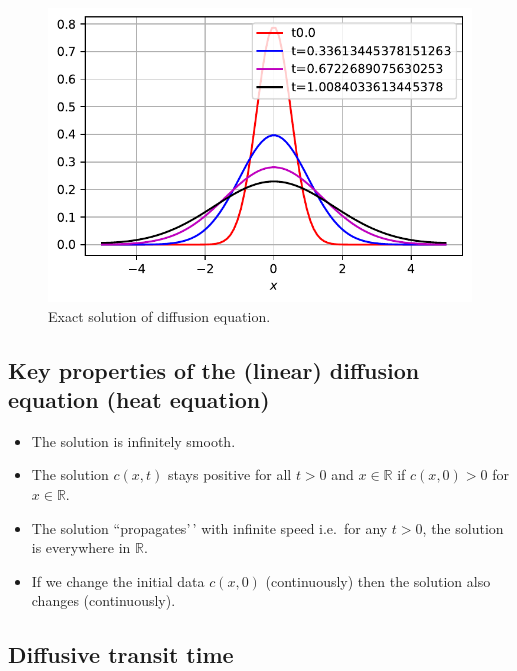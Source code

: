 \documentclass[
  letterpaper,
  DIV=11,
  numbers=noendperiod]{scrreprt}
\providecommand{\tightlist}{%
  \setlength{\itemsep}{0pt}\setlength{\parskip}{0pt}}\usepackage{longtable,booktabs,array}
\theoremstyle{definition}
\theoremstyle{plain}
\theoremstyle{plain}
\theoremstyle{remark}
\begin{document}
\begin{figure}

{\centering \includegraphics{linearreactiondiffusion_files/figure-pdf/fig-diffusionpde-output-2.pdf}

}

\caption{\label{fig-diffusionpde}Exact solution of diffusion equation.}

\end{figure}

\hypertarget{key-properties-of-the-linear-diffusion-equation-heat-equation}{%
\subsection{Key properties of the (linear) diffusion equation (heat
equation)}\label{key-properties-of-the-linear-diffusion-equation-heat-equation}}

\begin{itemize}
\tightlist
\item
  The solution is infinitely smooth.
\item
  The solution \(c(x,t)\) stays positive for all \(t >0\) and
  \(x \in \mathbb R\) if \(c(x,0) >0\) for \(x \in \mathbb R\).
\item
  The solution ``propagates'\,' with infinite speed i.e.~for any
  \(t > 0\), the solution is everywhere in \(\mathbb R\).
\item
  If we change the initial data \(c(x,0)\) (continuously) then the
  solution also changes (continuously).
\end{itemize}

\hypertarget{diffusive-transit-time}{%
\subsection{Diffusive transit time}\label{diffusive-transit-time}}
\end{document}

